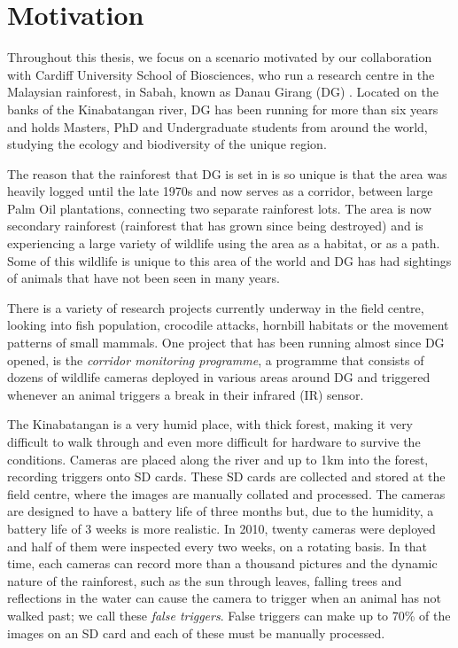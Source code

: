 \section{Motivation}\label{int:mot}
Throughout this thesis, we focus on a scenario motivated by our collaboration with Cardiff University School of Biosciences, who run a research centre in the Malaysian rainforest, in Sabah, known as Danau Girang (DG) . Located on the banks of the Kinabatangan river, DG has been running for more than six years and holds Masters, PhD and Undergraduate students from around the world, studying the ecology and biodiversity of the unique region.

The reason that the rainforest that DG is set in is so unique is that the area was heavily logged until the late 1970s and now serves as a corridor, between large Palm Oil plantations, connecting two separate rainforest lots. The area is now secondary rainforest (rainforest that has grown since being destroyed) and is experiencing a large variety of wildlife using the area as a habitat, or as a path. Some of this wildlife is unique to this area of the world and DG has had sightings of animals that have not been seen in many years.

There is a variety of research projects currently underway in the field centre, looking into fish population, crocodile attacks, hornbill habitats or the movement patterns of small mammals. One project that has been running almost since DG opened, is the \textit{corridor monitoring programme}, a programme that consists of dozens of wildlife cameras deployed in various areas around DG and triggered whenever an animal triggers a break in their infrared (IR)  sensor.

The Kinabatangan is a very humid place, with thick forest, making it very difficult to walk through and even more difficult for hardware to survive the conditions. Cameras are placed along the river and up to 1km into the forest, recording triggers onto SD cards. These SD cards are collected and stored at the field centre, where the images are manually collated and processed. The cameras are designed to have a battery life of three months but, due to the humidity, a battery life of 3 weeks is more realistic. In 2010, twenty cameras were deployed and half of them were inspected every two weeks, on a rotating basis. In that time, each cameras can record more than a thousand pictures and the dynamic nature of the rainforest, such as the sun through leaves, falling trees and reflections in the water can cause the camera to trigger when an animal has not walked past; we call these \textit{false triggers}. False triggers can make up to 70\% of the images on an SD card and each of these must be manually processed. 


